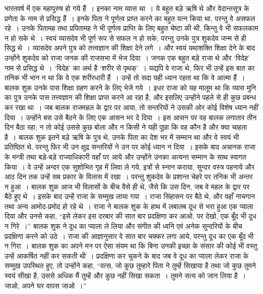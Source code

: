 भारतवर्ष में एक महापुरुष हो गये हैं~। इनका नाम व्यास था~। ये बहुत बड़े ऋषि थे और वेदान्तसूत्र के प्रणेता के नाम से प्रसिद्ध हैं~। इनके पिता ने पूर्णत्व प्राप्त करने का बहुत यत्न किया था, परन्तु वे असफल रहे~। उनके पितामह तथा प्रपितामह ने भी पूर्णत्व प्राप्ति के लिए बहुत चेष्टा की थी, किन्तु वे भी सफलकाम न हो सके थे~। स्वयं व्यासदेव भी पूर्ण रूप से सफल न हो सके; परन्तु उनके पुत्र शुकदेव जन्म से ही सिद्ध थे~। व्यासदेव अपने पुत्र को तत्त्वज्ञान की शिक्षा देने लगे~। और स्वयं यथाशक्ति शिक्षा देने के बाद उन्होंने शुकदेव को राजा जनक की राजसभा में भेज दिया~। जनक एक बहुत बड़े राजा थे और ‘विदेह’ नाम से प्रसिद्ध थे~। ‘विदेह’ का अर्थ है ‘शरीर से पृथक्’~। यद्यपि वे राजा थे, फिर भी उन्हें इस बात का तनिक भी भान न था कि वे एक शरीरधारी हैं~। उन्हें तो सदा यही ध्यान रहता था कि वे आत्मा हैं~। बालक शुक उनके पास शिक्षा ग्रहण करने के लिए भेजे गये~। इधर राजा को यह मालूम था कि व्यास मुनि का पुत्र उनके पास तत्त्वज्ञान की शिक्षा प्राप्त करने आ रहा है, और इसलिए उन्होंने पहले से ही कुछ प्रबन्ध कर रखा था~। जब बालक राजमहल के द्वार पर आया, तो सन्तरियों ने उसकी ओर कोई विशेष ध्यान नहीं दिया~। उन्होंने बस उसे बैठने के लिए एक आसन भर दे दिया~। इस आसन पर वह बालक लगातार तीन दिन बैठा रहा; न तो कोई उससे कुछ बोला और न किसी ने यही पूछा कि वह कौन है और क्या चाहता है~। बालक शुक इतने बड़े ऋषि के पुत्र थे, उनके पिता का देश भर में सम्मान था और वे स्वयं भी प्रतिष्ठित थे, परन्तु फिर भी उन क्षुद्र सन्तरियों ने उन पर कोई ध्यान न दिया~। इसके बाद अचानक राजा के मन्त्री तथा बड़े-बड़े राज्याधिकारी वहाँ पर आये और उन्होंने उनका अत्यन्त सम्मान के साथ स्वागत किया~। वे उन्हें अन्दर एक सुशोभित गृह में लिवा ले गये, इत्रों से स्नान कराया, सुन्दर वस्त्र पहनाये और आठ दिन तक उन्हें सब प्रकार के विलास में रखा~। परन्तु शुकदेव के प्रशान्त चेहरे पर तनिक भी अन्तर न हुआ~। बालक शुक आज भी विलासों के बीच वैसे ही थे, जैसे कि उस दिन, जब वे महल के द्वार पर बैठे हुए थे~। इसके बाद उन्हें राजा के सम्मुख लाया गया~। राजा सिंहासन पर बैठे थे, और वहाँ नाचगान तथा अन्य आमोद-प्रमोद हो रहे थे~। राजा ने बालक शुक के हाथ में लबालब दूध से भरा हुआ एक प्याला दिया और उनसे कहा, “इसे लेकर इस दरबार की सात बार प्रदक्षिणा कर आओ, पर देखो, एक बूँद भी दूध न गिरे~।” बालक शुक ने दूध का प्याला ले लिया और संगीत की ध्वनि एवं अनेक सुन्दरियों के बीच प्रदक्षिणा करने को उठे~। राजा की आज्ञानुसार वे सात बार चक्कर लगा आये, परन्तु दूध का एक बूँद भी न गिरा~। बालक शुक का अपने मन पर ऐसा संयम था कि बिना उनकी इच्छा के संसार की कोई भी वस्तु उन्हें आकर्षित नहीं कर सकती थी~। प्रदक्षिणा कर चुकने के बाद जब वे दूध का प्याला लेकर राजा के सम्मुख उपस्थित हुए, तो उन्होंने कहा, “वत्स, जो कुछ तुम्हारे पिता ने तुम्हें सिखाया है तथा जो कुछ तुमने स्वयं सीखा है, उससे अधिक मैं तुम्हें और कुछ नहीं सिखा सकता~। तुमने सत्य को जान लिया है~। जाओ, अपने घर वापस जाओ~।”


